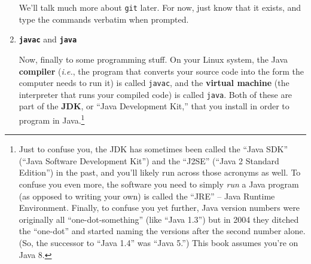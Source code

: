 \begin{enumerate}

We'll talk much more about \texttt{git} later. For now, just know that it
exists, and type the commands verbatim when prompted.

\bigline
\item \textbf{\texttt{javac}} and \textbf{\texttt{java}}

Now, finally to some programming stuff. On your Linux system, the Java
\textbf{compiler} (\textit{i.e.}, the program that converts your source code
into the form the computer needs to run it) is called \texttt{javac}, and the
\textbf{virtual machine} (the interpreter that runs your compiled code) is
called \texttt{java}. Both of these are part of the \textbf{JDK}, or ``Java
Development Kit,'' that you install in order to program in Java.\footnote{Just
to confuse you, the JDK has sometimes been called the ``Java SDK'' (``Java
Software Development Kit'') and the ``J2SE'' (``Java 2 Standard Edition'') in the
past, and you'll likely run across those acronyms as well. To confuse you even
more, the software you need to simply \textit{run} a Java program (as opposed
to writing your own) is called the ``JRE'' -- Java Runtime Environment.
Finally, to confuse you yet further, Java version numbers were originally all
``one-dot-something'' (like ``Java 1.3'') but in 2004 they ditched the
``one-dot'' and started naming the versions after the second number alone. (So,
the successor to ``Java 1.4'' was ``Java 5.'') This book assumes you're on Java
8.}



\end{enumerate}
